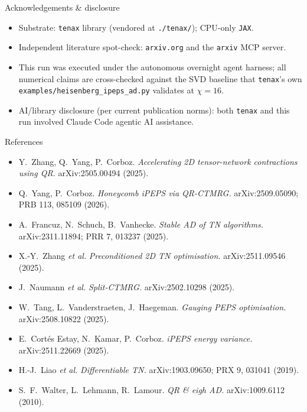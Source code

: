 \documentclass[11pt,aspectratio=169]{beamer}
\newcommand{\tenax}{\texttt{tenax}}
\newcommand{\jax}{\texttt{JAX}}
\begin{document}
\begin{frame}{Acknowledgements \& disclosure}
  \begin{itemize}
    \item Substrate: \tenax{} library (vendored at \texttt{./tenax/}); CPU-only \jax{}.
    \item Independent literature spot-check: \texttt{arxiv.org} and the \texttt{arxiv} MCP server.
    \item This run was executed under the autonomous overnight agent harness;
          all numerical claims are cross-checked against the SVD baseline that
          \tenax's own \texttt{examples/heisenberg\_ipeps\_ad.py} validates at $\chi=16$.
    \item AI/library disclosure (per current publication norms): both \tenax{} and
          this run involved Claude Code agentic AI assistance.
  \end{itemize}
\end{frame}

\begin{frame}{References}
  \footnotesize
  \begin{itemize}
    \item Y.~Zhang, Q.~Yang, P.~Corboz. \emph{Accelerating 2D tensor-network contractions using QR.} arXiv:2505.00494 (2025).
    \item Q.~Yang, P.~Corboz. \emph{Honeycomb iPEPS via QR-CTMRG.} arXiv:2509.05090; PRB 113, 085109 (2026).
    \item A.~Francuz, N.~Schuch, B.~Vanhecke. \emph{Stable AD of TN algorithms.} arXiv:2311.11894; PRR 7, 013237 (2025).
    \item X.-Y.~Zhang \emph{et al.} \emph{Preconditioned 2D TN optimisation.} arXiv:2511.09546 (2025).
    \item J.~Naumann \emph{et al.} \emph{Split-CTMRG.} arXiv:2502.10298 (2025).
    \item W.~Tang, L.~Vanderstraeten, J.~Haegeman. \emph{Gauging PEPS optimisation.} arXiv:2508.10822 (2025).
    \item E.~Cort\'es Estay, N.~Kamar, P.~Corboz. \emph{iPEPS energy variance.} arXiv:2511.22669 (2025).
    \item H.-J.~Liao \emph{et al.} \emph{Differentiable TN.} arXiv:1903.09650; PRX 9, 031041 (2019).
    \item S.~F.~Walter, L.~Lehmann, R.~Lamour. \emph{QR \& eigh AD.} arXiv:1009.6112 (2010).
  \end{itemize}
\end{frame}
\end{document}
